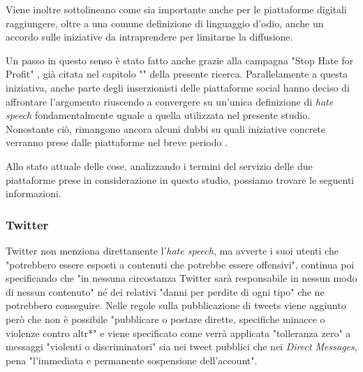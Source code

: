 Viene inoltre sottolineano come sia importante anche per le piattaforme digitali raggiungere, oltre a una comune definizione di linguaggio d'odio, anche un accordo sulle iniziative da intraprendere per limitarne la diffusione.

Un passo in questo senso è stato fatto anche grazie alla campagna "Stop Hate for Profit" \citep{stophate2020}, già citata nel capitolo "" della presente ricerca. Parallelamente a questa iniziativa, anche parte degli inserzionisti delle piattaforme social \citep{wfa2019} hanno deciso di affrontare l'argomento riuscendo a convergere su un'unica definizione di \textit{hate speech} fondamentalmente uguale a quella utilizzata nel presente studio. Nonostante ciò, rimangono ancora alcuni dubbi su quali iniziative concrete verranno prese dalle piattaforme nel breve periodo \citep{fischer2020}.

\vspace{5mm}

Allo stato attuale delle cose, analizzando i termini del servizio delle due piattaforme prese in considerazione in questo studio, possiamo trovare le seguenti informazioni.

\subsubsection{Twitter}
Twitter non menziona direttamente l'\textit{hate speech}, ma avverte i suoi utenti che "potrebbero essere esposti a contenuti che potrebbe essere offensivi", continua poi specificando che "in nessuna circostanza Twitter sarà responsabile in nessun modo di nessun contenuto" né dei relativi "danni per perdite di ogni tipo" che ne potrebbero conseguire. Nelle regole sulla pubblicazione di tweets viene aggiunto però che non è possibile "pubblicare o postare dirette, specifiche minacce o violenze contro altr*" \citep{twitter2019} e viene specificato come verrà applicata "tolleranza zero" a messaggi "violenti o discriminatori" sia nei tweet pubblici che nei \textit{Direct Messages}, pena "l'immediata e permanente sospensione dell'account".

